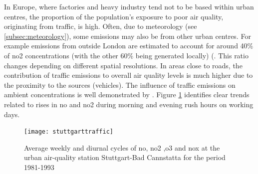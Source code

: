 
In Europe, where factories and heavy industry tend not to be based within urban centres, the proportion of the population's exposure to poor air quality, originating from traffic, is high. Often, due to meteorology (see \ref{subsec:meteorology}), some emissions may also be from other urban centres. For example emissions from outside London are estimated to account for around 40\% of \gls{no2} concentrations (with the other 60\% being generated locally) (\cite{GreaterLondonAuthorityGLA2010}. This ratio changes depending on different spatial resolutions. In areas close to roads, the contribution of traffic emissions to overall air quality levels is much higher due to the proximity to the sources (vehicles). The influence of traffic emissions on ambient concentrations is well demonstrated by \cite{Mayer1999}. Figure \ref{fig:stuttgarttraffic} identifies clear trends related to rises in \gls{no} and \gls{no2} during morning and evening rush hours on working days.

\begin{figure}[H]
\centering
\texttt{[image: stuttgarttraffic]}
\caption{Average weekly and diurnal cycles of \gls{no}, \gls{no2} ,\gls{o3} and \gls{nox} at the urban air-quality station Stuttgart-Bad Cannstatta for the period 1981-1993}
\label{fig:stuttgarttraffic}
\end{figure}

 

